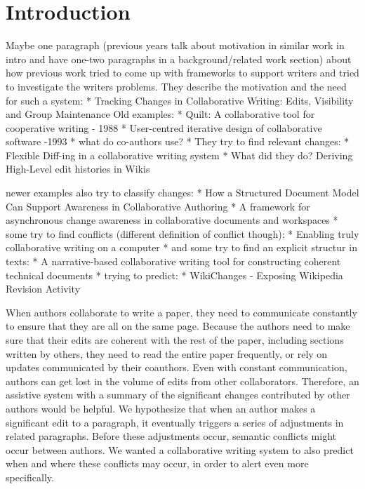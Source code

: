 \section{Introduction}\label{introduction}

Maybe one paragraph (previous years talk about motivation in similar
work in intro and have one-two paragraphs in a background/related work
section) about how previous work tried to come up with frameworks to
support writers and tried to investigate the writers problems. They
describe the motivation and the need for such a system: * Tracking
Changes in Collaborative Writing: Edits, Visibility and Group
Maintenance Old examples: * Quilt: A collaborative tool for cooperative
writing - 1988 * User-centred iterative design of collaborative software
-1993 * what do co-authors use? * They try to find relevant changes: *
Flexible Diff-ing in a collaborative writing system * What did they do?
Deriving High-Level edit histories in Wikis

newer examples also try to classify changes: * How a Structured Document
Model Can Support Awareness in Collaborative Authoring * A framework for
asynchronous change awareness in collaborative documents and workspaces
* some try to find conflicts (different definition of conflict though):
* Enabling truly collaborative writing on a computer * and some try to
find an explicit structur in texts: * A narrative-based collaborative
writing tool for constructing coherent technical documents * trying to
predict: * WikiChanges - Exposing Wikipedia Revision Activity

When authors collaborate to write a paper, they need to communicate
constantly to ensure that they are all on the same page. Because the
authors need to make sure that their edits are coherent with the rest of
the paper, including sections written by others, they need to read the
entire paper frequently, or rely on updates communicated by their
coauthors. Even with constant communication, authors can get lost in the
volume of edits from other collaborators. Therefore, an assistive system
with a summary of the significant changes contributed by other authors
would be helpful. We hypothesize that when an author makes a significant
edit to a paragraph, it eventually triggers a series of adjustments in
related paragraphs. Before these adjustments occur, semantic conflicts
might occur between authors. We wanted a collaborative writing system to
also predict when and where these conflicts may occur, in order to alert
even more specifically.

